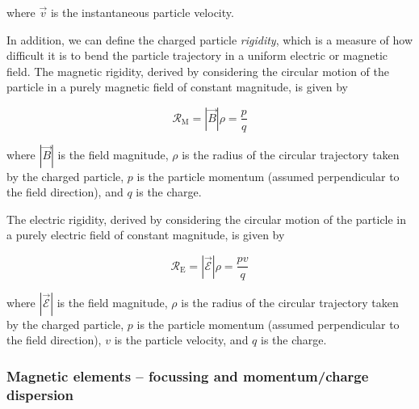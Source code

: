 where $\vec{v}$ is the instantaneous particle velocity. 

In addition, we can define the charged particle {\em rigidity}, which is a measure of how difficult it is to bend the particle trajectory in a uniform electric or magnetic field. The magnetic rigidity, derived by considering the circular motion of the particle in a purely magnetic field of constant magnitude, is given by

\begin{equation}
\label{magrigidity}
\mathcal{R}_\mathrm{M}=|\vec{B}|\rho=\frac{p}{q}
\end{equation}

where $|\vec{B}|$ is the field magnitude, $\rho$ is the radius of the circular trajectory taken by the charged particle, $p$ is the particle momentum (assumed perpendicular to the field direction), and $q$ is the charge.

The electric rigidity, derived by considering the circular motion of the particle in a purely electric field of constant magnitude, is given by

\begin{equation}
\mathcal{R}_\mathrm{E}=|\vec{\mathcal{E}}|\rho=\frac{pv}{q}
\end{equation}

where $|\vec{\mathcal{E}}|$ is the field magnitude, $\rho$ is the radius of the circular trajectory taken by the charged particle, $p$ is the particle momentum (assumed perpendicular to the field direction), $v$ is the particle velocity, and $q$ is the charge.


\subsubsection{Magnetic elements -- focussing and momentum/charge dispersion}\label{magel}


